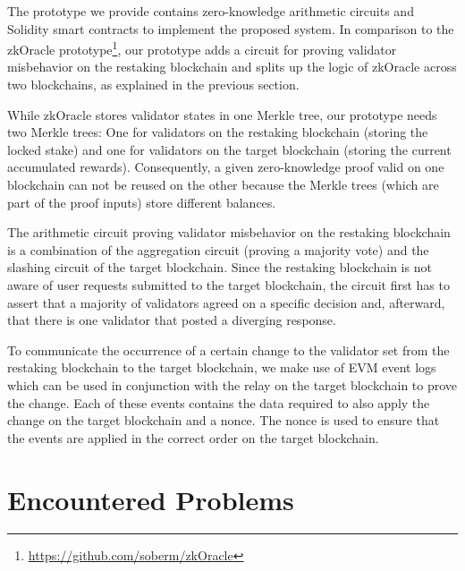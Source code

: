 \documentclass{article}
\begin{document}
	The prototype we provide contains zero-knowledge arithmetic circuits and Solidity smart contracts to implement the proposed system.
	In comparison to the zkOracle prototype\footnote{\url{https://github.com/soberm/zkOracle}}, our prototype adds a circuit for proving validator misbehavior on the restaking blockchain and splits up the logic of zkOracle across two blockchains, as explained in the previous section.
	
	While zkOracle stores validator states in one Merkle tree, our prototype needs two Merkle trees:
	One for validators on the restaking blockchain (storing the locked stake) and one for validators on the target blockchain (storing the current accumulated rewards).
	Consequently, a given zero-knowledge proof valid on one blockchain can not be reused on the other because the Merkle trees (which are part of the proof inputs) store different balances.
	
	The arithmetic circuit proving validator misbehavior on the restaking blockchain is a combination of the aggregation circuit (proving a majority vote) and the slashing circuit of the target blockchain.
	Since the restaking blockchain is not aware of user requests submitted to the target blockchain, the circuit first has to assert that a majority of validators agreed on a specific decision and, afterward, that there is one validator that posted a diverging response.
	
	To communicate the occurrence of a certain change to the validator set from the restaking blockchain to the target blockchain, we make use of EVM event logs which can be used in conjunction with the relay on the target blockchain to prove the change.
	Each of these events contains the data required to also apply the change on the target blockchain and a nonce.
	The nonce is used to ensure that the events are applied in the correct order on the target blockchain.
	
	\section{Encountered Problems}
	\label{sec:problems}
	
\end{document}
